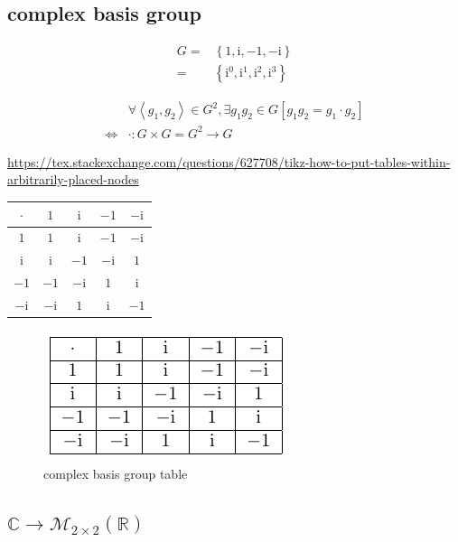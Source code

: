 \documentclass[
]{book}
\theoremstyle{definition}
\theoremstyle{definition}
\theoremstyle{definition}
\theoremstyle{definition}
\theoremstyle{remark}
\begin{document}
\hypertarget{complex-basis-group}{%
\subsection{complex basis group}\label{complex-basis-group}}

\[
\begin{aligned}
G= & \left\{ 1,\mathrm{i},-1,-\mathrm{i}\right\} \\
= & \left\{ \mathrm{i}^{0},\mathrm{i}^{1},\mathrm{i}^{2},\mathrm{i}^{3}\right\} 
\end{aligned}
\]

\[
\begin{aligned}
 & \forall\left\langle g_{{\scriptscriptstyle 1}},g_{{\scriptscriptstyle 2}}\right\rangle \in G^{2},\exists g_{{\scriptscriptstyle 1}}g_{{\scriptscriptstyle 2}}\in G\left[g_{{\scriptscriptstyle 1}}g_{{\scriptscriptstyle 2}}=g_{{\scriptscriptstyle 1}}\cdot g_{{\scriptscriptstyle 2}}\right]\\
\Leftrightarrow & \cdot:G\times G=G^{2}\rightarrow G
\end{aligned}
\]

\url{https://tex.stackexchange.com/questions/627708/tikz-how-to-put-tables-within-arbitrarily-placed-nodes}

\begin{tabular}{|c|c|c|c|c|}
\hline 
$\cdot$ & $1$ & $\mathrm{i}$ & $-1$ & $-\mathrm{i}$\tabularnewline
\hline 
$1$ & $1$ & $\mathrm{i}$ & $-1$ & $-\mathrm{i}$\tabularnewline
\hline 
$\mathrm{i}$ & $\mathrm{i}$ & $-1$ & $-\mathrm{i}$ & $1$\tabularnewline
\hline 
$-1$ & $-1$ & $-\mathrm{i}$ & $1$ & $\mathrm{i}$\tabularnewline
\hline 
$-\mathrm{i}$ & $-\mathrm{i}$ & $1$ & $\mathrm{i}$ & $-1$\tabularnewline
\hline 
\end{tabular}

\begin{figure}
\centering
\includegraphics{202403281312-group-theory_files/figure-latex/unnamed-chunk-3-1.pdf}
\caption{\label{fig:unnamed-chunk-3}complex basis group table}
\end{figure}

\hypertarget{mathbbcrightarrowmathcalm_2times2leftmathbbrright}{%
\subsection{\texorpdfstring{\(\mathbb{C}\rightarrow\mathcal{M}_{2\times2}\left(\mathbb{R}\right)\)}{\textbackslash mathbb\{C\}\textbackslash rightarrow\textbackslash mathcal\{M\}\_\{2\textbackslash times2\}\textbackslash left(\textbackslash mathbb\{R\}\textbackslash right)}}\label{mathbbcrightarrowmathcalm_2times2leftmathbbrright}}
\end{document}

